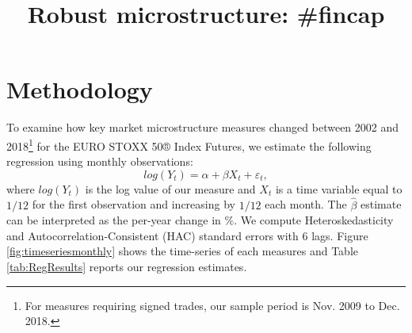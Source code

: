 \documentclass[hidelinks, 11pt]{article}
\def\papertitle{Robust microstructure: \#fincap}
\begin{document}
%	
%	
\title{	\vspace{-3.5em}\papertitle \vspace{-2em} }



	
	\maketitle
	
	\vspace{-4.5em}
%
%		
%		
%		
%
%	
%	
	\fontsize{12}{22}\selectfont
	
	

\section{Methodology}

To examine how key market microstructure measures changed between 2002 and 2018\footnote{For measures requiring signed trades, our sample period is Nov. 2009 to Dec. 2018.} for the EURO STOXX 50® Index Futures, we estimate the following regression using monthly observations:
\begin{equation}
log(Y_t) = \alpha + \beta X_t + \varepsilon_t,
\end{equation}
where $log(Y_t)$ is the log value of our measure and $X_t$ is a time variable equal to $1/12$ for the first observation and increasing by $1/12$ each month. The $\widehat{\beta}$ estimate can be interpreted as the per-year change in \%. We compute Heteroskedasticity and Autocorrelation-Consistent (HAC) standard errors with 6 lags. Figure \ref{fig:timeseriesmonthly} shows the time-series of each measures and Table \ref{tab:RegResults} reports our regression estimates.
\end{document}
